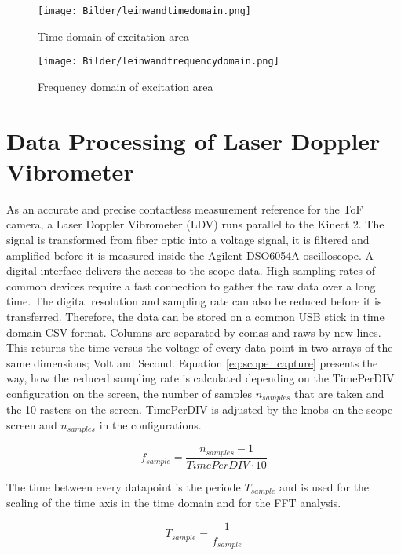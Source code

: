 \begin{figure}[!h]
	\centering
	\texttt{[image: Bilder/leinwandtimedomain.png]}
	\caption{Time domain of excitation area}
	\label{fig:timedomain_leinwand}
\end{figure}

\begin{figure}[!h]
	\centering
	\texttt{[image: Bilder/leinwandfrequencydomain.png]}
	\caption{Frequency domain of excitation area}
	\label{fig:frequencydomain_leinwand}
\end{figure}

\newpage

\section{Data Processing of Laser Doppler Vibrometer} \label{chap:LDV_processing}
As an accurate and precise contactless measurement reference for the ToF camera, a Laser Doppler Vibrometer (LDV) runs parallel to the Kinect 2. The signal is transformed from fiber optic into a voltage signal, it is filtered and amplified before it is measured inside the Agilent DSO6054A oscilloscope. A digital interface delivers the access to the scope data. High sampling rates of common devices require a fast connection to gather the raw data over a long time. The digital resolution and sampling rate can also be reduced before it is transferred. Therefore, the data can be stored on a common USB stick in time domain CSV format. Columns are separated by comas and raws by new lines. This returns the time versus the voltage of every data point in two arrays of the same dimensions; Volt and Second. Equation \ref{eq:scope_capture} presents the way, how the reduced sampling rate is calculated depending on the TimePerDIV configuration on the screen, the number of samples $n_{samples}$ that are taken and the 10 rasters on the screen. TimePerDIV is adjusted by the knobs on the scope screen and $n_{samples}$ in the configurations.

\begin{equation}
\label{eq:scope_capture}
f_{sample}= \frac{n_{samples}-1}{TimePerDIV\cdot 10}
\end{equation}
\medskip

The time between every datapoint is the periode $T_{sample}$ and is used for the scaling of the time axis in the time domain and for the FFT analysis. 

\begin{equation}
\label{eq:sampling_period}
T_{sample}= \frac{1}{f_{sample}}
\end{equation}

